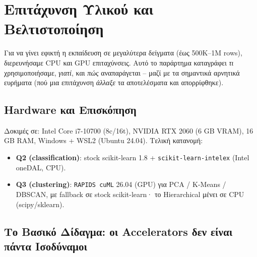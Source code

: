 \documentclass[12pt,a4paper,twoside]{book}
\begin{document}
\chapter{Επιτάχυνση Υλικού και Βελτιστοποίηση}\label{ch:gpu}

Για να γίνει εφικτή η εκπαίδευση σε μεγαλύτερα δείγματα (έως 500K--1M
rows), διερευνήσαμε CPU και GPU επιταχύνσεις. Αυτό το παράρτημα καταγράφει
\emph{τι} χρησιμοποιήσαμε, \emph{γιατί}, και \emph{πώς} αναπαράγεται --
μαζί με τα σημαντικά αρνητικά ευρήματα (πού μια επιτάχυνση \emph{άλλαξε}
τα αποτελέσματα και απορρίφθηκε).

\section{Hardware και Επισκόπηση}

Δοκιμές σε: Intel Core i7-10700 (8c/16t), NVIDIA RTX 2060 (6 GB VRAM),
16 GB RAM, Windows + WSL2 (Ubuntu 24.04). Τελική κατανομή:
\begin{itemize}
    \item \textbf{Q2 (classification)}: stock scikit-learn 1.8 +
    \texttt{scikit-learn-intelex} (Intel oneDAL, CPU).
    \item \textbf{Q3 (clustering)}: \texttt{RAPIDS cuML} 26.04 (GPU) για
    PCA / K-Means / DBSCAN, με fallback σε stock scikit-learn· το
    Hierarchical μένει σε CPU (scipy/sklearn).
\end{itemize}

\section{Το Βασικό Δίδαγμα: οι Accelerators δεν είναι πάντα Ισοδύναμοι}
\end{document}
